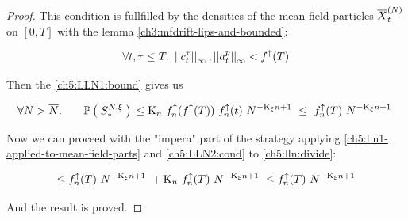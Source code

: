 \begin{proof}
	This condition is fullfilled by the densities of the mean-field particles $\overline{X}_t^{(N)}$ on $[0,T]$ with the lemma \ref{ch3:mfdrift-lips-and-bounded}:
	
	\begin{equation*}
		\forall t, \tau \leq T.\
		\left|\left| c_t^\tau \right|\right|_\infty, \left|\left| a_t^p \right|\right|_\infty < f^\uparrow(T)
	\end{equation*}
	
	Then the \ref{ch5:LLN1:bound} gives us
	
	\begin{equation}\label{ch5:lln1-applied-to-mean-field-parts}
		 \forall N> \overline{N}.	\qquad
		 \mathbb{P} \left( \; S^{N,\xi}_\ast \; \right){}
		\leq 
		\text{K}_n\
		f^\uparrow_n(f^\uparrow(T))\
		f^\uparrow_n(t)\
		N^{-\text{K}_\xi n + 1}\
		\leq\
		f^\uparrow_n(T)\
		N^{-\text{K}_\xi n + 1}\
	\end{equation}
	
	Now we can proceed with the "impera" part of the strategy applying \ref{ch5:lln1-applied-to-mean-field-parts} and \ref{ch5:LLN2:cond} to \ref{ch5:lln:divide}:
	
	\begin{equation*}
		\leq
		f^\uparrow_n(T)\
		N^{-\text{K}_\xi n + 1}\
		+
		\text{K}_n\
		f^\uparrow_n(T)\
		N^{-\text{K}_\xi n + 1}\
		\leq
		f^\uparrow_n(T)\
		N^{-\text{K}_\xi n + 1}
	\end{equation*}
	
	And the result is proved.
\end{proof}
